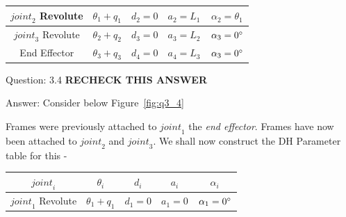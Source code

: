 \documentclass[a4paper]{article}
\begin{document}
\begin{qalist}
\begin{minipage}{\linewidth}
\begin{tabular}{|c|c|c|c|c|}
					\hline
					${joint}_{2}$ Revolute & ${\theta}_{1} + {q}_{1}$ & ${d}_{2} = 0$ & ${a}_{2} = {L}_{1}$ & ${\alpha}_{2} = {\theta}_{1}$\\
					\hline
					${joint}_{3}$ Revolute & ${\theta}_{2} + {q}_{2}$ & ${d}_{3} = 0$ & ${a}_{3} = {L}_{2}$ & ${\alpha}_{3} = 0 \degree$\\
					\hline
					End Effector & ${\theta}_{3} + {q}_{3}$ & ${d}_{4} = 0$ & ${a}_{4} = {L}_{3}$ & ${\alpha}_{3} = 0 \degree$\\
					\hline
				\end{tabular}
				\vspace{0.5cm}
			\end{minipage}	
			
		\item[Question: 3.4] \setcounter{equation}{0} \textbf{RECHECK THIS ANSWER} %
		\item[Answer:] Consider below Figure~\ref{fig:q3_4} \\
			\begin{minipage}{\linewidth}
				\vspace{0.5cm}
				\centering
				\label{fig:q3_4}
				\vspace{0.5cm}
			\end{minipage}
			Frames were previously attached to ${joint}_{1}$ the \textit{end effector}. Frames have now been attached to ${joint}_{2}$ and ${joint}_{3}$.
			We shall now construct the DH Parameter table for this - \\
			\begin{minipage}{\linewidth}
				\vspace{0.5cm}
				\centering
				\begin{tabular}{|c|c|c|c|c|}
					\hline
					${joint}_{i}$ & ${\theta}_{i}$ & ${d}_{i}$ & ${a}_{i}$ & ${\alpha}_{i}$\\
					\hline
					${joint}_{1}$ Revolute & ${\theta}_{1} + {q}_{1}$ & ${d}_{1} = 0$ & ${a}_{1} = 0$ & ${\alpha}_{1} = 0 \degree$\\

\end{tabular}
\end{minipage}
\end{qalist}
\end{document}
